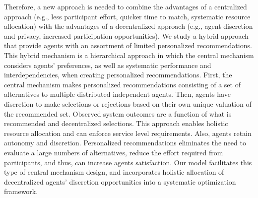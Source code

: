 \documentclass[11pt, letterpaper]{article}
\begin{document}
Therefore, a new approach is needed to combine the advantages of a centralized approach (e.g., less participant effort, quicker time to match, systematic resource allocation) with the advantages of a decentralized approach (e.g., agent discretion and privacy, increased participation opportunities). We study a hybrid approach that provide agents with an assortment of limited personalized recommendations. This hybrid mechanism is a  hierarchical approach in which the central mechanism considers agents' preferences, as well as systematic performance and interdependencies, when creating personalized recommendations. First, the central mechanism makes personalized recommendations consisting of a set of alternatives to multiple distributed independent agents.  Then, agents have discretion to make selections or rejections based on their own unique valuation of the recommended set. Observed system outcomes are a function of what is recommended and decentralized selections. This approach enables holistic resource allocation and can enforce service level requirements. Also, agents retain autonomy and discretion. Personalized recommendations eliminates the need to evaluate a large numbers of  alternatives, reduce the effort required from participants, and thus, can increase agents satisfaction. Our model facilitates this type of central mechanism design, and incorporates  holistic allocation of decentralized agents' discretion opportunities into a systematic optimization framework.  
\end{document}
